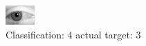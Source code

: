 \begin{figure}[h!]
\begin{center}
\includegraphics[width=0.60\columnwidth]{figures/ID2855_class_4_target_3.png}
\end{center}
\caption{ Classification: 4 actual target: 3}
\label{fig:ID2855_class_4_target_3}
\end{figure}
